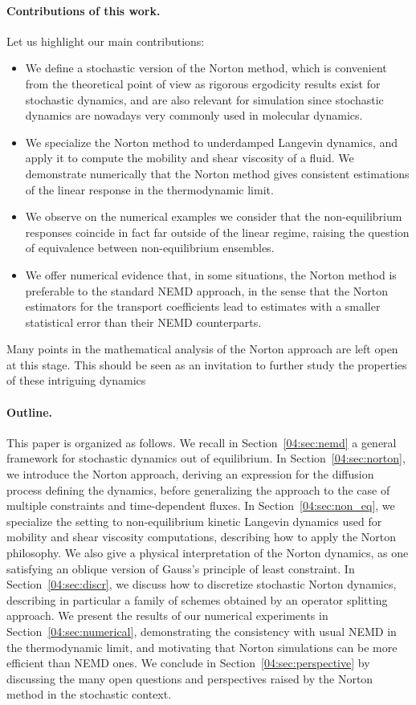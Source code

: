 \paragraph{Contributions of this work.} Let us highlight our main contributions:
\begin{itemize}
\item{We define a stochastic version of the Norton method, which is convenient from the theoretical point of view as rigorous ergodicity results exist for stochastic dynamics, and are also relevant for simulation since stochastic dynamics are nowadays very commonly used in molecular dynamics.}
\item{We specialize the Norton method to underdamped Langevin dynamics, and apply it to compute the mobility and shear viscosity of a fluid. We demonstrate numerically that the Norton method gives consistent estimations of the linear response in the thermodynamic limit.}
\item{We observe on the numerical examples we consider that the non-equilibrium responses coincide in fact far outside of the linear regime, raising the question of equivalence between non-equilibrium ensembles.}
\item{We offer numerical evidence that, in some situations, the Norton method is preferable to the standard NEMD approach, in the sense that the Norton estimators for the transport coefficients lead to estimates with a smaller statistical error than their NEMD counterparts.}
\end{itemize}
Many points in the mathematical analysis of the Norton approach are left open at this stage. This should be seen as an invitation to further study the properties of these intriguing dynamics

\paragraph{Outline.}
This paper is organized as follows. We recall in Section~\ref{04:sec:nemd} a general framework for stochastic dynamics out of equilibrium. In Section~\ref{04:sec:norton}, we introduce the Norton approach, deriving an expression for the diffusion process defining the dynamics, before generalizing the approach to the case of multiple constraints and time-dependent fluxes. In Section~\ref{04:sec:non_eq}, we specialize the setting to non-equilibrium kinetic Langevin dynamics used for mobility and shear viscosity computations, describing how to apply the Norton philosophy. We also give a physical interpretation of the Norton dynamics, as one satisfying an oblique version of Gauss's principle of least constraint. In Section~\ref{04:sec:discr}, we discuss how to discretize stochastic Norton dynamics, describing in particular a family of schemes obtained by an operator splitting approach. We present the results of our numerical experiments in Section~\ref{04:sec:numerical}, demonstrating the consistency with usual NEMD in the thermodynamic limit, and motivating that Norton simulations can be more efficient than NEMD ones. We conclude in Section~\ref{04:sec:perspective} by discussing the many open questions and perspectives raised by the Norton method in the stochastic context.

